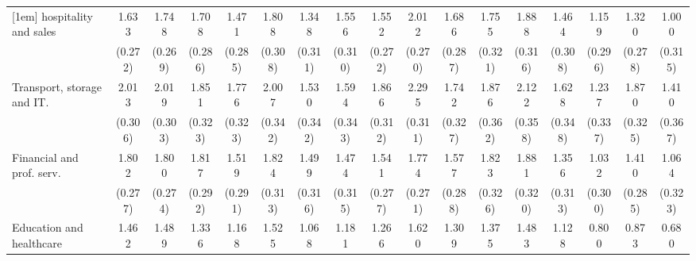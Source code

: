 {\begin{tabular}{l*{16}{c}}
[1em]
hospitality and sales&       1.633\sym{***}&       1.748\sym{***}&       1.708\sym{***}&       1.471\sym{***}&       1.808\sym{***}&       1.348\sym{***}&       1.556\sym{***}&       1.552\sym{***}&       2.012\sym{***}&       1.686\sym{***}&       1.755\sym{***}&       1.888\sym{***}&       1.464\sym{***}&       1.159\sym{***}&       1.320\sym{***}&       1.000\sym{**} \\
                    &     (0.272)         &     (0.269)         &     (0.286)         &     (0.285)         &     (0.308)         &     (0.311)         &     (0.310)         &     (0.272)         &     (0.270)         &     (0.287)         &     (0.321)         &     (0.316)         &     (0.308)         &     (0.296)         &     (0.278)         &     (0.315)         \\
[1em]
Transport, storage and IT.&       2.013\sym{***}&       2.019\sym{***}&       1.851\sym{***}&       1.776\sym{***}&       2.007\sym{***}&       1.530\sym{***}&       1.594\sym{***}&       1.866\sym{***}&       2.295\sym{***}&       1.742\sym{***}&       1.876\sym{***}&       2.122\sym{***}&       1.628\sym{***}&       1.237\sym{***}&       1.870\sym{***}&       1.410\sym{***}\\
                    &     (0.306)         &     (0.303)         &     (0.323)         &     (0.323)         &     (0.342)         &     (0.342)         &     (0.343)         &     (0.312)         &     (0.311)         &     (0.327)         &     (0.362)         &     (0.358)         &     (0.348)         &     (0.337)         &     (0.325)         &     (0.367)         \\
[1em]
Financial and prof. serv.&       1.802\sym{***}&       1.800\sym{***}&       1.817\sym{***}&       1.519\sym{***}&       1.824\sym{***}&       1.499\sym{***}&       1.474\sym{***}&       1.541\sym{***}&       1.774\sym{***}&       1.577\sym{***}&       1.823\sym{***}&       1.881\sym{***}&       1.356\sym{***}&       1.032\sym{***}&       1.410\sym{***}&       1.064\sym{***}\\
                    &     (0.277)         &     (0.274)         &     (0.292)         &     (0.291)         &     (0.313)         &     (0.316)         &     (0.315)         &     (0.277)         &     (0.271)         &     (0.288)         &     (0.326)         &     (0.320)         &     (0.313)         &     (0.300)         &     (0.285)         &     (0.323)         \\
[1em]
Education and healthcare&       1.462\sym{***}&       1.489\sym{***}&       1.336\sym{***}&       1.168\sym{***}&       1.525\sym{***}&       1.068\sym{***}&       1.181\sym{***}&       1.266\sym{***}&       1.620\sym{***}&       1.309\sym{***}&       1.375\sym{***}&       1.483\sym{***}&       1.128\sym{***}&       0.800\sym{**} &       0.873\sym{**} &       0.680\sym{*}  \\

\end{tabular}}
